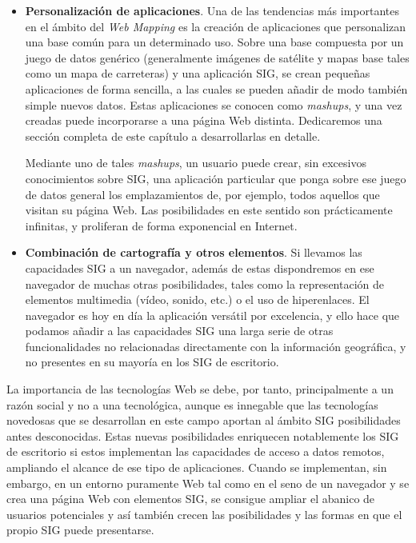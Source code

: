 \begin{itemize}
	\item \textbf{Personalización de aplicaciones}. Una de las tendencias más importantes en el ámbito del \emph{Web Mapping} es la creación de aplicaciones que personalizan una base común para un determinado uso. Sobre una base compuesta por un juego de datos genérico (generalmente imágenes de satélite y mapas base tales como un mapa de carreteras) y una aplicación SIG, se crean pequeñas aplicaciones de forma sencilla, a las cuales se pueden añadir de modo también simple nuevos datos. Estas aplicaciones se conocen como \emph{mashups}, y una vez creadas puede incorporarse a una página Web distinta. Dedicaremos una sección completa de este capítulo a desarrollarlas en detalle.
	
	Mediante uno de tales \emph{mashups}, un usuario puede crear, sin excesivos conocimientos sobre SIG, una aplicación particular que ponga sobre ese juego de datos general los emplazamientos de, por ejemplo, todos aquellos que visitan su página Web. Las posibilidades en este sentido son prácticamente infinitas, y proliferan de forma exponencial en Internet.
	\item \textbf{Combinación de cartografía y otros elementos}. Si llevamos las capacidades SIG a un navegador, además de estas dispondremos en ese navegador de muchas otras posibilidades, tales como la representación de elementos multimedia (vídeo, sonido, etc.) o el uso de hiperenlaces. El navegador es hoy en día la aplicación versátil por excelencia, y ello hace que podamos añadir a las capacidades SIG una larga serie de otras funcionalidades no relacionadas directamente con la información geográfica, y no presentes en su mayoría en los SIG de escritorio.
\end{itemize}

La importancia de las tecnologías Web se debe, por tanto, principalmente a un razón social y no a una tecnológica, aunque es innegable que las tecnologías novedosas que se desarrollan en este campo aportan al ámbito SIG posibilidades antes desconocidas. Estas nuevas posibilidades enriquecen notablemente los SIG de escritorio si estos implementan las capacidades de acceso a datos remotos, ampliando el alcance de ese tipo de aplicaciones. Cuando se implementan, sin embargo, en un entorno puramente Web tal como en el seno de un navegador y se crea una página Web con elementos SIG, se consigue ampliar el abanico de usuarios potenciales y así también crecen las posibilidades y las formas en que el propio SIG puede presentarse.


